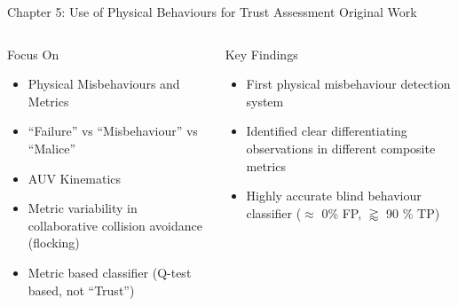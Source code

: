 \documentclass[aspectratio=169]{beamer}
\begin{document}
\begin{frame}{Chapter 5: Use of Physical Behaviours for Trust Assessment}
  Original Work
  \begin{columns}
    \begin{column}{0.5\textwidth}
      \begin{block}{Focus On}
        \begin{itemize}
          \item Physical Misbehaviours and Metrics
          \item ``Failure'' vs ``Misbehaviour'' vs ``Malice''
          \item AUV Kinematics
          \item Metric variability in collaborative collision avoidance (flocking)
          \item Metric based classifier (Q-test based, not ``Trust'')
        \end{itemize}
      \end{block}
    \end{column}
    \begin{column}{0.5\textwidth}
      \begin{exampleblock}{Key Findings}
        \begin{itemize}
        	\item First physical misbehaviour detection system
        	\item Identified clear differentiating observations in different composite metrics
        	\item Highly accurate blind behaviour classifier ($\approx$ 0\% FP, $\gtrapprox$ 90 \% TP)
        \end{itemize}
      \end{exampleblock}
    \end{column}
  \end{columns}
\end{frame}
\end{document}
